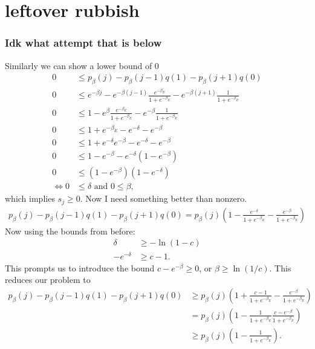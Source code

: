 \documentclass{article}
\newcommand{\parens}[1]{\left( #1 \right)}
\begin{document}
 
   \section{leftover rubbish}

\subsubsection{Idk what attempt that is below}
Similarly we can show a lower bound of 0
\begin{align}
    0 &\leq p_{\beta}(j) - p_{\beta}(j-1) q(1) - p_{\beta}(j+1) q(0) \\
    0 &\leq e^{-\beta j} - e^{-\beta(j - 1)} \frac{e^{-\beta_E}}{1 + e^{-\beta_E}} - e^{-\beta(j+1)} \frac{1}{1 + e^{-\beta_E}} \\
    0 &\leq 1 - e^{\beta} \frac{e^{-\beta_E}}{1 + e^{-\beta_E}} - e^{-\beta} \frac{1}{1 + e^{-\beta_E}} \\
    0&\leq 1 + e^{-\beta_E} -e^{-\delta} - e^{-\beta} \\
    0 &\leq 1 + e^{-\delta} e^{-\beta} - e^{-\delta } - e^{-\beta} \\
    0 &\leq 1 - e^{-\beta} - e^{-\delta} (1 - e^{-\beta}) \\
    0 &\leq (1-e^{-\beta})(1 - e^{-\delta}) \\
    \iff 0 &\leq \delta \text{ and } 0 \leq \beta,
\end{align}
which implies $s_j \ge 0$. Now I need something better than nonzero. 
\begin{align}
    p_{\beta}(j) - p_{\beta}(j-1) q(1) - p_{\beta}(j+1) q(0) = p_{\beta}(j) \left( 1 - \frac{e^{-\delta}}{1 + e^{-\beta_E}} - \frac{e^{-\beta}}{1 + e^{-\beta_E}} \right) 
\end{align}
Now using the bounds from before:
\begin{align}
    \delta &\geq - \ln(1 - c) \\
    - e^{-\delta} &\geq c - 1. 
\end{align}
This prompts us to introduce the bound $c - e^{-\beta} \ge 0$, or $\beta \geq \ln(1/c)$. This reduces our problem to
\begin{align}
    p_{\beta}(j) - p_{\beta}(j-1) q(1) - p_{\beta}(j+1) q(0) &\ge p_{\beta}(j)\parens{1 + \frac{c - 1}{1 + e^{-\beta_E}} - \frac{e^{-\beta}}{1 + e^{-\beta_E}}} \\
    &= p_{\beta}(j)\parens{1 - \frac{1}{1 + e^{-\beta_E}} \frac{c - e^{-\beta}}{1 + e^{-\beta_E}}} \\
    &\ge p_{\beta}(j) \parens{1 - \frac{1}{1 + e^{-\beta_E}}}.
\end{align}
\end{document}
